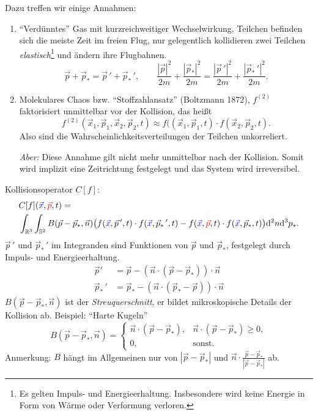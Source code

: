 Dazu treffen wir einige Annahmen:
\begin{enumerate}
\item ``Verdünntes'' Gas mit kurzreichweitiger Wechselwirkung, Teilchen
  befinden sich die meiste Zeit im freien Flug, nur gelegentlich kollidieren zwei
  Teilchen \emph{elastisch}\footnote{%
    Es gelten Impuls- und Energieerhaltung. Insbesondere wird keine Energie in
    Form von Wärme oder Verformung verloren.
  } und ändern ihre Flugbahnen.
  \[ \vec{p} + \vec{p}_* = \vec{p}\,' + \vec{p}_*\,', \qquad
    \frac{|\vec{p}|^2}{2m} + \frac{|\vec{p}_*|^2}{2m} =
    \frac{|\vec{p}\,'|^2}{2m} + \frac{|\vec{p}_*\,'|^2}{2m}. \]
\item Molekulares Chaos bzw. ``Stoffzahlansatz'' (Boltzmann 1872), $f^{(2)}$
  faktorisiert unmittelbar vor der Kollision, das heißt
  \[ f^{(2)}( \vec{x}_1, \vec{p}_1, \vec{x}_2, \vec{p}_2, t) \approx
    f(( \vec{x}_1, \vec{p}_1, t) \cdot f(\vec{x}_2, \vec{p}_2, t ). \]
  Also sind die Wahrscheinlichkeitsverteilungen der Teilchen unkorreliert.

  \emph{Aber:} Diese Annahme gilt nicht mehr unmittelbar nach der Kollision.
  Somit wird implizit eine Zeitrichtung festgelegt und das System wird
  irreversibel.
\end{enumerate}

Kollisionsoperator $C[f]$:
\begin{align*}
  &C[f] ({\color{blue} \vec{x}}, {\color{red} \vec{p}}, t) = \\
  &\int_{\mathbb{R}^3} \int_{\mathbb{S}^2}
  B(\vec{p} - \vec{p}_*, \vec{n})
  \big(
  f( {\color{blue}\vec{x}}, \vec{p}\,', t ) \cdot
  f( {\color{blue}\vec{x}}, \vec{p}_*\,', t ) -
  f( {\color{blue}\vec{x}}, {\color{red} \vec{p}}, t ) \cdot
  f( {\color{blue}\vec{x}}, \vec{p}_*, t )
  \big)
  \mathrm{d}^2 n \mathrm{d}^3 p_*.
\end{align*}
$\vec{p}\,'$ und $\vec{p}_*\,'$ im Integranden sind Funktionen von $\vec{p}$ und
$\vec{p}_*$, festgelegt durch Impuls- und Energieerhaltung.
\[ \begin{aligned}
    \vec{p}'
    &= \vec{p} - ( \vec{n} \cdot ( \vec{p} - \vec{p}_* ) ) \cdot \vec{n} \\
    \vec{p}_*\,'
    &= \vec{p}_* - ( \vec{n} \cdot ( \vec{p}_* - \vec{p} ) ) \cdot \vec{n}
  \end{aligned}
\]
$B( \vec{p} - \vec{p}_*, \vec{n} )$ ist der \emph{Streuquerschnitt}, er bildet
mikroskopische Details der Kollision ab. Beispiel: ``Harte Kugeln''
\[ B( \vec{p} - \vec{p}_*, \vec{n} ) = \begin{cases}
    \vec{n} \cdot ( \vec{p} - \vec{p}_* ), &
    \vec{n} \cdot ( \vec{p} - \vec{p}_* ) \ge 0, \\
    0, & \text{sonst.}
  \end{cases}
\]
Anmerkung: $B$ hängt im Allgemeinen nur von $|\vec{p}-\vec{p}_*|$ und $\vec{n}
\cdot \frac{\vec{p}-\vec{p}_*}{|\vec{p}-\vec{p}_*|}$ ab.

